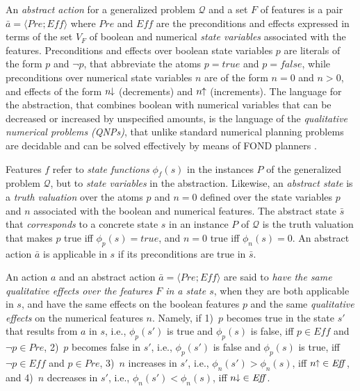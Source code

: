 \documentclass[letterpaper]{article} %
\newcommand{\tup}[1]{\langle #1 \rangle}
\newcommand{\Q}{\mathcal{Q}}
\newcommand{\Eff}{{\mathit{Eff}}}
\newcommand{\abst}[2]{\tup{#1;#2}}
\newcommand{\pplus}{\hspace{-.05em}\raisebox{.15ex}{\footnotesize$\uparrow$}}
\newcommand{\mminus}{\hspace{-.05em}\raisebox{.15ex}{\footnotesize$\downarrow$}}
\begin{document}
An \emph{abstract action}  for a generalized problem $\Q$ and a set $F$ of features
is a pair $\bar{a}=\abst{Pre}{\Eff}$ where $Pre$ and $\Eff$ are the  preconditions
and effects expressed in terms of the  set $V_F$ of boolean and numerical \emph{state variables}
associated with the features. Preconditions and effects over boolean state variables $p$ are literals of the form $p$
and $\neg p$, that abbreviate the  atoms $p=true$ and $p=false$, while
preconditions over  numerical state variables $n$ are of  the form $n=0$ and $n > 0$,
and effects of the form  $n\mminus$ (decrements) and  $n\pplus$ (increments).
The language for the abstraction,  that combines boolean with numerical variables
that can be decreased or increased by unspecified amounts, is the language of the \emph{qualitative numerical problems (QNPs)},
that unlike standard numerical planning problems \cite{helmert:numerical}
are decidable and can be solved effectively by means of  FOND planners \cite{srivastava:aaai2011,bonet:ijcai2017}.


Features $f$ refer to \emph{state functions} $\phi_f(s)$ in the instances $P$ 
of the generalized problem $\Q$, but to \emph{state variables} in  the abstraction.
Likewise, an \emph{abstract state} is  a \emph{truth valuation} over
the atoms $p$ and $n=0$ defined over the state variables $p$ and $n$
associated with the boolean and  numerical features.
The abstract state $\bar{s}$ that \emph{corresponds} to a concrete state $s$
in an instance $P$ of $\Q$ is the truth valuation that makes $p$ true iff $\phi_p(s)=true$,
and $n=0$ true iff $\phi_n(s) = 0$. An abstract action $\bar{a}$ is applicable in  $s$
if its preconditions
are true in $\bar{s}$. 

An action $a$ and an abstract action $\bar{a}=\abst{Pre}{\Eff}$ are said to \emph{have  the same qualitative effects over the features $F$
in a state $s$}, when they are both applicable in $s$,  and have the same effects on the boolean features $p$ and
the same \emph{qualitative effects} on the numerical features $n$. Namely, if 1)~$p$ becomes true in the state $s'$
that results from $a$ in $s$, i.e., $\phi_p(s')$ is true and $\phi_p(s)$  is false,
iff $p \in \Eff$ and $\neg p \in Pre$, 2)~$p$ becomes false in $s'$, i.e., $\phi_p(s')$ is false and $\phi_p(s)$  is true,
iff $\neg p \in \Eff$ and $p \in Pre$, 3)~$n$ increases in $s'$, i.e., $\phi_n(s') > \phi_n(s)$, iff $n\pplus \in \Eff$,
and 4)~$n$ decreases  in $s'$, i.e., $\phi_n(s') < \phi_n(s)$, iff $n\mminus \in \Eff$.
\end{document}
